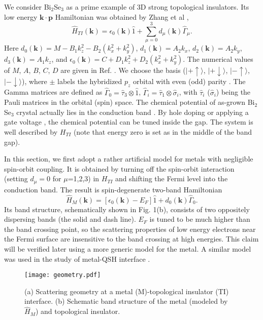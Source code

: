 \documentclass[11pt]{report}
\def\v#1{\mathbf{#1}}
\def\ket#1{\vert #1 \rangle}
\begin{document}
We consider Bi$_2$Se$_3$ as a prime example of 3D strong topological insulators. Its low energy $\mathbf{k\cdot p}$ Hamiltonian was obtained by Zhang et al \cite{zhang2009},
\[
\hat{H}_{TI}(\v{k})=\epsilon_0(\v{k})\hat{1}+\sum_{\mu=0}^{3}d_\mu(\v{k})\hat{\Gamma}_\mu.
\]
Here $d_0(\v{k})=M-B_1k^2_z-B_2(k_x^2+k_y^2)$, $d_1(\v{k})=A_2 k_x$, $d_2(\v{k})=A_2 k_y$, $d_3(\v{k})=A_1 k_z$, and $\epsilon_0(\v{k})=C+D_1k_z^2+D_2(k_x^2+k_y^2)$. The numerical values of $M$, $A$, $B$, $C$, $D$ are given in Ref. 
\cite{zhang2009}.
We choose the basis ($\ket{+\uparrow}$, $\ket{+\downarrow}$, $\ket{-\uparrow}$,$\ket{-\downarrow}$), where $\pm$ labels the hybridized $p_z$ orbital with even (odd) parity \cite{zhang2009}. The Gamma matrices are defined as
$\hat{\Gamma}_0=\hat{\tau}_3\otimes \hat{1}$, $\hat{\Gamma}_i=\hat{\tau}_1\otimes \hat{\sigma}_i$, with
$\hat{\tau}_i$ ($\hat{\sigma}_i$) being the Pauli matrices in the orbital (spin) space.
The chemical potential of as-grown Bi$_2$Se$_3$ crystal actually lies in the conduction 
band \cite{Hsieh2009}. By hole doping \cite{Hsieh2009} 
or applying a gate voltage \cite{gate}, the chemical potential can be tuned inside 
the gap. The system is well described by $H_{TI}$ (note that energy zero is set as 
in the middle of the band gap).

In this section, we first adopt a rather artificial model for metals with negligible 
spin-orbit coupling. It is
obtained by turning off the spin-orbit interaction (setting $d_\mu=0$ for $\mu$=1,2,3) 
in $H_{TI}$ and shifting the Fermi level into 
the conduction band. The result is spin-degenerate two-band Hamiltonian
\[
\hat{H}_M(\v{k})=[\epsilon_0(\v{k})-E_F]\hat{1}+d_0(\v{k})\hat{\Gamma}_0.
\]
Its band structure, schematically shown in Fig. 1(b), consists of two oppositely dispersing bands 
(the solid and dash line). $E_F$ is tuned to be much higher than the band crossing point, so
the scattering properties of low energy electrons near the Fermi surface are 
insensitive to the band crossing at high energies. This claim will be verified later using a
more generic model for the metal. A similar model was used in the study of metal-QSH interface \cite{yokoyama09}.


\begin{figure}
\texttt{[image: geometry.pdf]}
\caption{(a) Scattering geometry at a metal (M)-topological insulator (TI) interface.
(b) Schematic band structure of the metal (modeled by $\hat{H}_M$) and topological insulator.
}
\end{figure}
\end{document}
